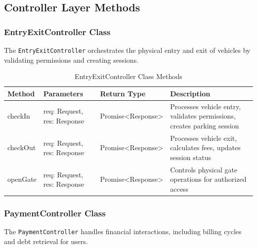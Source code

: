 \subsection{Controller Layer Methods}

\subsubsection{EntryExitController Class}
The \texttt{EntryExitController} orchestrates the physical entry and exit of vehicles by validating permissions and creating sessions.

\begin{table}[H]
\centering
\footnotesize
\renewcommand{\arraystretch}{1.3}
\begin{tabularx}{\textwidth}{|>{\RaggedRight\arraybackslash}X|>{\RaggedRight\arraybackslash}X|>{\RaggedRight\arraybackslash}X|>{\RaggedRight\arraybackslash}X|}
\hline
\textbf{Method} & \textbf{Parameters} & \textbf{Return Type} & \textbf{Description} \\
\hline
checkIn & req: Request, res: Response & Promise<Response> & Processes vehicle entry, validates permissions, creates parking session \\
\hline
checkOut & req: Request, res: Response & Promise<Response> & Processes vehicle exit, calculates fees, updates session status \\
\hline
openGate & req: Request, res: Response & Promise<Response> & Controls physical gate operations for authorized access \\
\hline
\end{tabularx}
\caption{EntryExitController Class Methods}
\label{tab:entry-exit-controller-methods}
\end{table}

\subsubsection{PaymentController Class}
The \texttt{PaymentController} handles financial interactions, including billing cycles and debt retrieval for users.

